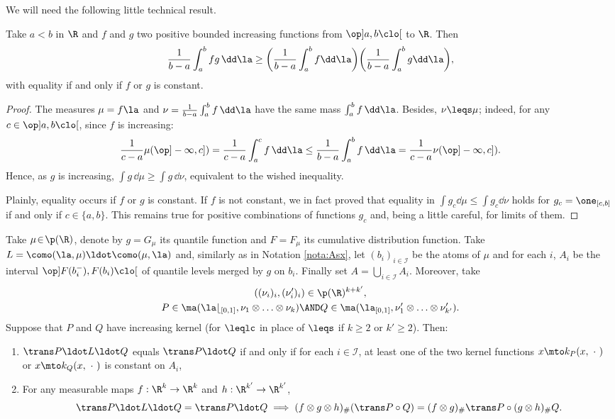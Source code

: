 We will need the following little technical result.

\begin{lem}\label{lem:int_fg}Take $a<b$ in $\R$ and $f$ and $g$ two positive bounded increasing functions from $\op]a,b\clo[$ to $\R$. Then
\[
\frac1{b-a}\int_a^b fg\,\dd\la\geq \biggl(\frac1{b-a}\int_a^b f\dd\la\biggr)\biggl(\frac1{b-a}\int_a^b g\dd\la\biggr),
\]
with equality if and only if $f$ or $g$ is constant.
\end{lem}

\begin{proof} The %
measures $\mu=f\la$ and $\nu=\frac1{b-a}\int_a^b f\,\dd\la$ have the same mass $\int_a^b f\,\dd\la$. Besides, $\nu\leqs\mu$; indeed, for any $c\in\op]a,b\clo[$, since $f$ is increasing:
\[\frac1{c-a}\mu(\op]-\infty,c])=\frac1{c-a}\int_{a}^c f\,\dd\la\leq\frac1{b-a}\int_{a}^b f\,\dd\la=\frac1{c-a}\nu(\op]-\infty,c]).\]
Hence, as $g$ is increasing, $\int g\,\dd\mu\geq\int g\,\dd\nu$, equivalent to the wished inequality.

Plainly, equality occurs if $f$ or $g$ is constant. If $f$ is not constant, we in fact proved that equality in $\int g_c \dd \mu\leq \int g_c \dd \nu$ holds for $g_c=\one_{[c,b]}$ if and only if $c\in\{a,b\}$. This remains true for positive combinations of functions $g_c$ and, being a little careful, for limits of them.
\end{proof}

\begin{lem}\label{lem:distributivite} Take $\mu\!\in\!\p(\R)$, denote by $g\!=\!G_\mu$ its quantile function and \hbox{$F\!=\!F_\mu$} its cumulative distribution function. Take $L=\como(\la,\mu)\ldot\como(\mu,\la)$ and, similarly as in Nota\-tion \ref{nota:Asx}, let $(b_i)_{i\in{\mathcal{I}}}$ be the atoms of $\mu$ and for each $i$, $A_i$ be the interval $\op]F(b_i^-),F(b_i)\clo[$ of quantile levels merged by $g$ on $b_i$. Finally set $A=\bigcup_{i\in\mathcal{I}}A_i$. Moreover, take\vspace*{-3pt}
\begin{gather*}
((\nu_i)_i,(\nu'_i)_i)\in\p(\R)^{k+k'},\\
P\in \ma(\la\lfloor_{[0,1]},\nu_1\otimes\ldots\otimes\nu_k)\AND Q\in\ma(\la_{[0,1]},\nu'_1\otimes\ldots\otimes\nu'_{k'}).
\end{gather*}
Suppose that $P$ and $Q$ have increasing kernel (for $\leqlc$ in place of $\leqs$ if $k\geq 2$ or $k'\geq2$). Then:
\begin{enumerate}
\item
\label{item:lem:distributiviteA} $\trans P\ldot L\ldot Q$ equals $\trans P\ldot Q$ if and only if for each $i\in{\mathcal I}$, at least one of the two kernel functions $x\mto k_P(x,\ \cdot\ )$ or $x\mto k_Q(x,\ \cdot\ )$ is constant on $A_i$,

\item
\label{item:lem:distributiviteB} For any measurable maps $f:\R^k\to\R^k$ and $h:\R^{k'}\to\R^{k'}$,
\[
\trans P\ldot L\ldot Q=\trans P\ldot Q\implies (f\otimes g \otimes h)_\#(\trans P\circ Q)=(f\otimes g)_\#\trans P\circ (g \otimes h)_\#Q.
\]
\end{enumerate}
\end{lem}

